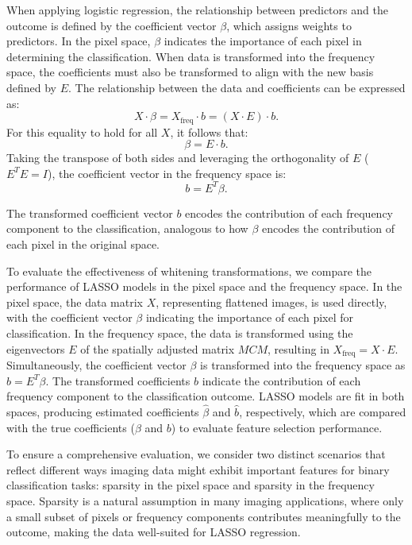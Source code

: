 \documentclass[12pt]{article}
\begin{document}
When applying logistic regression, the relationship between predictors and the outcome is defined by the coefficient vector \( \beta \), which assigns weights to predictors. In the pixel space, \( \beta \) indicates the importance of each pixel in determining the classification. When data is transformed into the frequency space, the coefficients must also be transformed to align with the new basis defined by \( E \). The relationship between the data and coefficients can be expressed as:
\[
  X \cdot \beta = X_{\text{freq}} \cdot b = (X \cdot E) \cdot b.
\]
For this equality to hold for all \( X \), it follows that:
\[
  \beta = E \cdot b.
\]
Taking the transpose of both sides and leveraging the orthogonality of \( E \) (\( E^T E = I \)), the coefficient vector in the frequency space is:
\[
  b = E^T \beta.
\]

The transformed coefficient vector \( b \) encodes the contribution of each frequency component to the classification, analogous to how \( \beta \) encodes the contribution of each pixel in the original space.

To evaluate the effectiveness of whitening transformations, we compare the performance of LASSO models in the pixel space and the frequency space. In the pixel space, the data matrix \( X \), representing flattened images, is used directly, with the coefficient vector \( \beta \) indicating the importance of each pixel for classification. In the frequency space, the data is transformed using the eigenvectors \( E \) of the spatially adjusted matrix \( MCM \), resulting in \( X_{\text{freq}} = X \cdot E \). Simultaneously, the coefficient vector \( \beta \) is transformed into the frequency space as \( b = E^T \beta \). The transformed coefficients \( b \) indicate the contribution of each frequency component to the classification outcome. LASSO models are fit in both spaces, producing estimated coefficients \( \hat{\beta} \) and \( \hat{b} \), respectively, which are compared with the true coefficients (\( \beta \) and \( b \)) to evaluate feature selection performance.

To ensure a comprehensive evaluation, we consider two distinct scenarios that reflect different ways imaging data might exhibit important features for binary classification tasks: sparsity in the pixel space and sparsity in the frequency space. Sparsity is a natural assumption in many imaging applications, where only a small subset of pixels or frequency components contributes meaningfully to the outcome, making the data well-suited for LASSO regression.
\end{document}

